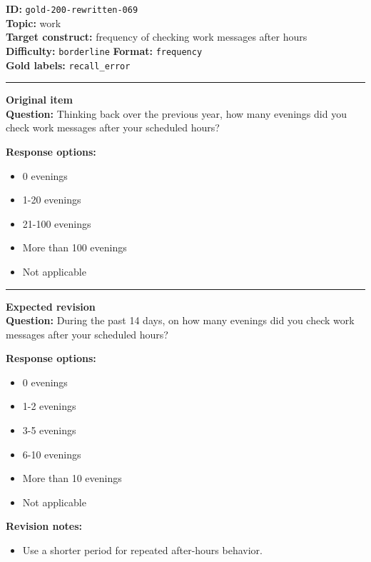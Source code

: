 \documentclass[10pt,a4paper]{article}
\newcommand{\sectionline}{\vspace{0.15em}\hrule\vspace{0.35em}}
\begin{document}
\begin{tcolorbox}[colframe=FlawRed,colback=white,colbacktitle=FlawRed!9,coltitle=black,title={Item 069\hfill Flawed item}]
\textbf{ID:} \texttt{gold-200-rewritten-069}\\
\textbf{Topic:} work\\
\textbf{Target construct:} frequency of checking work messages after hours\\
\textbf{Difficulty:} \texttt{borderline} \quad \textbf{Format:} \texttt{frequency}\\
\textbf{Gold labels:} \texttt{recall\_error}\\
\sectionline
\textbf{Original item}\\
\textbf{Question:} Thinking back over the previous year, how many evenings did you check work messages after your scheduled hours?
\par\textbf{Response options:}
\begin{itemize}
\item 0 evenings
\item 1-20 evenings
\item 21-100 evenings
\item More than 100 evenings
\item Not applicable
\end{itemize}
\sectionline
\textbf{Expected revision}\\
\textbf{Question:} During the past 14 days, on how many evenings did you check work messages after your scheduled hours?
\par\textbf{Response options:}
\begin{itemize}
\item 0 evenings
\item 1-2 evenings
\item 3-5 evenings
\item 6-10 evenings
\item More than 10 evenings
\item Not applicable
\end{itemize}
\par\textbf{Revision notes:}
\begin{itemize}
\item Use a shorter period for repeated after-hours behavior.
\end{itemize}
\end{tcolorbox}
\end{document}
